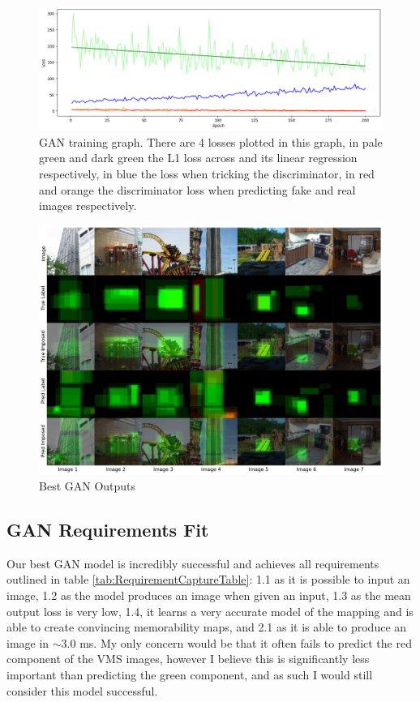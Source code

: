 \documentclass{UoYCSproject}
\begin{document}
\begin{figure}[ht]
    \centering
    \includegraphics[width=\linewidth]{GAN Training Curve}
    \caption{GAN training graph. There are 4 losses plotted in this graph, in pale green and dark green the L1 loss across and its linear regression respectively, in blue the loss when tricking the discriminator, in red and orange the discriminator loss when predicting fake and real images respectively.}
    \label{fig:GANTraining}
\end{figure}

\begin{figure}[ht]
    \centering
    \includegraphics[width=\linewidth]{Good GAN Outputs}
    \caption{Best GAN Outputs}
    \label{fig:GANGoodOutput}
\end{figure}

\subsection{GAN Requirements Fit}
Our best GAN model is incredibly successful and achieves all requirements outlined in table \ref{tab:RequirementCaptureTable}: 1.1 as it is possible to input an image, 1.2 as the model produces an image when given an input, 1.3 as the mean output loss is very low, 1.4, it learns a very accurate model of the mapping and is able to create convincing memorability maps, and 2.1 as it is able to produce an image in \( \sim 3.0 \) ms. My only concern would be that it often fails to predict the red component of the VMS images, however I believe this is significantly less important than predicting the green component, and as such I would still consider this model successful.
\end{document}
